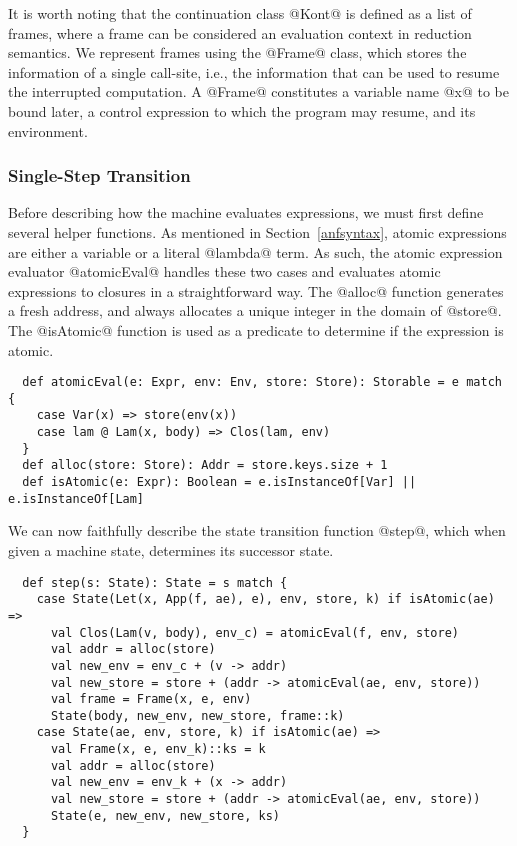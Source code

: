 \documentclass[acmsmall, review]{acmart}\settopmatter{}
\begin{document}
It is worth noting that the continuation class @Kont@ is defined as a list of
frames, where a frame can be considered an evaluation context in reduction semantics.
We represent frames using the @Frame@ class, which stores the information of a single
call-site, i.e., the information that can be used to resume the interrupted computation.
A @Frame@ constitutes a variable name @x@ to be bound later, a control expression
to which the program may resume, and its environment.

\subsubsection{Single-Step Transition}
Before describing how the machine evaluates expressions, we must first define several helper
functions. As mentioned in Section~\ref{anfsyntax}, atomic expressions are either a variable
or a literal @lambda@ term. As such, the atomic expression evaluator @atomicEval@ handles
these two cases and evaluates atomic expressions to closures in a straightforward way.
The @alloc@ function generates a fresh address, and always allocates a unique integer
in the domain of @store@.
The @isAtomic@ function is used as a predicate to determine if the expression is atomic.

\begin{lstlisting}
  def atomicEval(e: Expr, env: Env, store: Store): Storable = e match {
    case Var(x) => store(env(x))
    case lam @ Lam(x, body) => Clos(lam, env)
  }
  def alloc(store: Store): Addr = store.keys.size + 1
  def isAtomic(e: Expr): Boolean = e.isInstanceOf[Var] || e.isInstanceOf[Lam]
\end{lstlisting}

We can now faithfully describe the state transition function @step@,
which when given a machine state, determines its successor state.

\begin{lstlisting}
  def step(s: State): State = s match {
    case State(Let(x, App(f, ae), e), env, store, k) if isAtomic(ae) =>
      val Clos(Lam(v, body), env_c) = atomicEval(f, env, store)
      val addr = alloc(store)
      val new_env = env_c + (v -> addr)
      val new_store = store + (addr -> atomicEval(ae, env, store))
      val frame = Frame(x, e, env)
      State(body, new_env, new_store, frame::k)
    case State(ae, env, store, k) if isAtomic(ae) =>
      val Frame(x, e, env_k)::ks = k
      val addr = alloc(store)
      val new_env = env_k + (x -> addr)
      val new_store = store + (addr -> atomicEval(ae, env, store))
      State(e, new_env, new_store, ks)
  }
\end{lstlisting}
\end{document}
